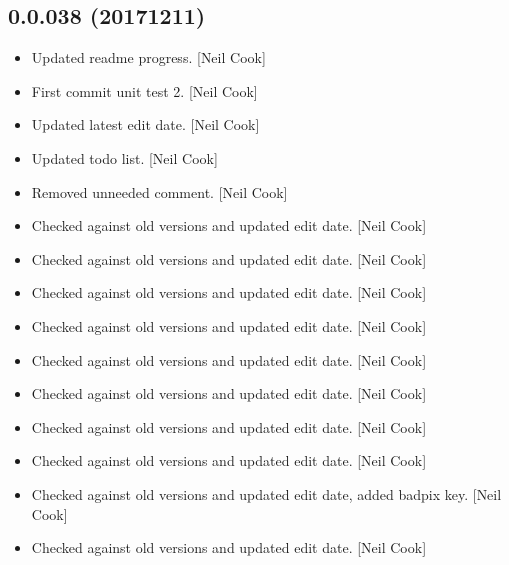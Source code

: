 \documentclass[a4paper,10pt,english]{report}
\begin{document}
\subsection{0.0.038 (2017\sphinxhyphen{}12\sphinxhyphen{}11)}
\label{\detokenize{misc/changelog:id532}}\begin{itemize}
\item {} 
Updated readme progress. {[}Neil Cook{]}

\item {} 
First commit unit test 2. {[}Neil Cook{]}

\item {} 
Updated latest edit date. {[}Neil Cook{]}

\item {} 
Updated todo list. {[}Neil Cook{]}

\item {} 
Removed unneeded comment. {[}Neil Cook{]}

\item {} 
Checked against old versions and updated edit date. {[}Neil Cook{]}

\item {} 
Checked against old versions and updated edit date. {[}Neil Cook{]}

\item {} 
Checked against old versions and updated edit date. {[}Neil Cook{]}

\item {} 
Checked against old versions and updated edit date. {[}Neil Cook{]}

\item {} 
Checked against old versions and updated edit date. {[}Neil Cook{]}

\item {} 
Checked against old versions and updated edit date. {[}Neil Cook{]}

\item {} 
Checked against old versions and updated edit date. {[}Neil Cook{]}

\item {} 
Checked against old versions and updated edit date. {[}Neil Cook{]}

\item {} 
Checked against old versions and updated edit date, added badpix key.
{[}Neil Cook{]}

\item {} 
Checked against old versions and updated edit date. {[}Neil Cook{]}

\end{itemize}
\end{document}
